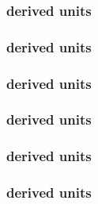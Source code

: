 \subsubsection*{ derived units} \begin{sbmlenum}


\end{sbmlenum} 

\subsubsection*{ derived units} \begin{sbmlenum}


\end{sbmlenum} 

\subsubsection*{ derived units} \begin{sbmlenum}


\end{sbmlenum} 

\subsubsection*{ derived units} \begin{sbmlenum}


\end{sbmlenum} 

\subsubsection*{ derived units} \begin{sbmlenum}


\end{sbmlenum} 

\subsubsection*{ derived units} \begin{sbmlenum}


\end{sbmlenum}


